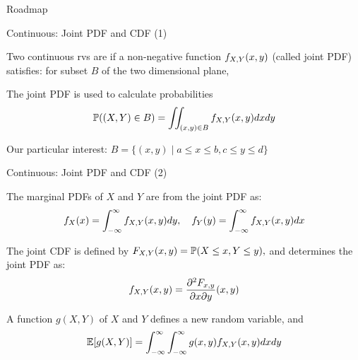 
\begin{frame}{Roadmap}

\plitemsep 0.1in
\bce[(1)]
\item {}

\item {}

\item {}

\item {}

\item {}

\item {}

\ece
\end{frame}


\begin{frame}{Continuous: Joint PDF and CDF (1)}

{
Two continuous rvs are  if a non-negative function $f_{X,Y}(x,y)$ (called joint PDF) satisfies: for  subset $B$ of the two dimensional plane,
\vspace{-0.3cm}
}

\plitemsep 0.1in
\bce 
\item<3-> The joint PDF is used to calculate probabilities  
$$\mathbb{P}( (X,Y) \in B ) = \iint_{(x,y) \in B} f_{X,Y}(x,y) dx dy$$

Our particular interest: $B = \{(x,y) \mid a \le x \le b, c \le y \le d \}$
\ece

\end{frame}

\begin{frame}{Continuous: Joint PDF and CDF (2)}

\plitemsep 0.1in
\bce
\item<2->[2.] The marginal PDFs of $X$ and $Y$ are from the joint PDF as: 
$$
f_X(x) = \int_{-\infty}^\infty f_{X,Y}(x,y) dy, \quad f_Y(y) = \int_{-\infty}^\infty f_{X,Y}(x,y) dx
$$

\item<3->[3.] The joint CDF is defined by $F_{X,Y}(x,y) = \mathbb{P}( X \le x, Y \le y ),$ and determines the joint PDF as:
$$
f_{X,Y}(x,y) = \frac{\partial^2 F_{x,y}}{\partial x \partial y} (x,y)
$$

\item<4->[4.] A function $g(X,Y)$ of $X$ and $Y$ defines a new random variable, and
$$
\mathbb{E}[ g(X,Y) ] = \int_{-\infty}^\infty \int_{-\infty}^\infty g(x,y) f_{X,Y}(x,y) dx dy
$$
\ece

\end{frame}

